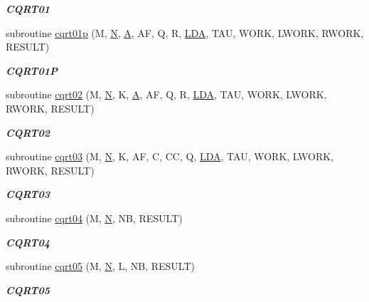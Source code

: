 \begin{DoxyCompactItemize}
\begin{DoxyCompactList}\small\item\em {\bfseries C\+Q\+R\+T01} \end{DoxyCompactList}\item 
subroutine \hyperlink{group__complex__lin_ga1f524f1f8c96464bbb14fe986e238150}{cqrt01p} (M, \hyperlink{polmisc_8c_a0240ac851181b84ac374872dc5434ee4}{N}, \hyperlink{classA}{A}, A\+F, Q, R, \hyperlink{example__user_8c_ae946da542ce0db94dced19b2ecefd1aa}{L\+D\+A}, T\+A\+U, W\+O\+R\+K, L\+W\+O\+R\+K, R\+W\+O\+R\+K, R\+E\+S\+U\+L\+T)
\begin{DoxyCompactList}\small\item\em {\bfseries C\+Q\+R\+T01\+P} \end{DoxyCompactList}\item 
subroutine \hyperlink{group__complex__lin_ga1c74c4685c72400d9d7743d2330ab4dd}{cqrt02} (M, \hyperlink{polmisc_8c_a0240ac851181b84ac374872dc5434ee4}{N}, K, \hyperlink{classA}{A}, A\+F, Q, R, \hyperlink{example__user_8c_ae946da542ce0db94dced19b2ecefd1aa}{L\+D\+A}, T\+A\+U, W\+O\+R\+K, L\+W\+O\+R\+K, R\+W\+O\+R\+K, R\+E\+S\+U\+L\+T)
\begin{DoxyCompactList}\small\item\em {\bfseries C\+Q\+R\+T02} \end{DoxyCompactList}\item 
subroutine \hyperlink{group__complex__lin_ga2e80b8ccb3ec02f9f6483c8419935733}{cqrt03} (M, \hyperlink{polmisc_8c_a0240ac851181b84ac374872dc5434ee4}{N}, K, A\+F, C, C\+C, Q, \hyperlink{example__user_8c_ae946da542ce0db94dced19b2ecefd1aa}{L\+D\+A}, T\+A\+U, W\+O\+R\+K, L\+W\+O\+R\+K, R\+W\+O\+R\+K, R\+E\+S\+U\+L\+T)
\begin{DoxyCompactList}\small\item\em {\bfseries C\+Q\+R\+T03} \end{DoxyCompactList}\item 
subroutine \hyperlink{group__complex__lin_ga138dd9a546d9e5d285886e2e0536b7c6}{cqrt04} (M, \hyperlink{polmisc_8c_a0240ac851181b84ac374872dc5434ee4}{N}, N\+B, R\+E\+S\+U\+L\+T)
\begin{DoxyCompactList}\small\item\em {\bfseries C\+Q\+R\+T04} \end{DoxyCompactList}\item 
subroutine \hyperlink{group__complex__lin_gad1807ec476c7957b14517e3402779c6c}{cqrt05} (M, \hyperlink{polmisc_8c_a0240ac851181b84ac374872dc5434ee4}{N}, L, N\+B, R\+E\+S\+U\+L\+T)
\begin{DoxyCompactList}\small\item\em {\bfseries C\+Q\+R\+T05} \end{DoxyCompactList}\item 

\end{DoxyCompactItemize}
